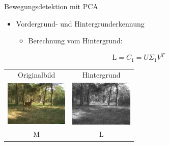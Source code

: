 \begin{frame}[t,fragile]{Bewegungsdetektion mit PCA}
	\begin{itemize}
 \item Vordergrund- und Hintergrunderkennung
 \begin{itemize}
        \item{Berechnung vom Hintergrund:}
      \end{itemize}


{\large
\begin{equation}
\text{L}=C_1 = U\Sigma_1 V^T
\end{equation}
}
 
  \end{itemize}

  \vspace{0.01em}
  {
\begin{table}
\centering
        \begin{tabular}{cc}
        Originalbild  & Hintergrund \\
        \includegraphics[width=3cm]{img/Segmentierung/original-image}
         &
         \includegraphics[width=3cm]{img/Segmentierung/background-image}\\
M  & L \\
         \end{tabular}
        
\end{table}
 }
\end{frame}

